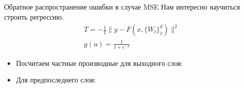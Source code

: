 \documentclass[14pt, fleqn, xcolor={dvipsnames, table}]{beamer}
\begin{document}
\begin{frame}{Обратное распространение ошибки в случае MSE}
\footnotesize
Нам интересно научиться строить регрессию.
$$\begin{array}{c}
T = -\frac{1}{2}\|y - F(x, \{W_l\}_1^d)\|^2 \\
g(u) = \frac{1}{1 + e^{-u}}
\end{array}$$


\begin{itemize}
  \item Посчитаем частные производные для выходного слоя:
  \item Для предпоследнего слоя:
\end{itemize}
\end{frame}

\end{document}
